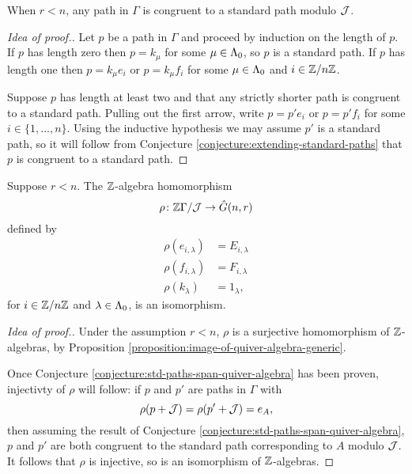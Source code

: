 \documentclass[a4paper, 11pt, twoside]{report}
\begin{document}
\begin{conjecture}\label{conjecture:std-paths-span-quiver-algebra}
When $r<n$, any path in $\Gamma$ is congruent to a standard path modulo $\mathcal{J}$.
\end{conjecture}

\begin{proof}[Idea of proof.]
Let $p$ be a path in $\Gamma$ and proceed by induction on the length of $p$. If $p$ has length zero then $p=k_\mu$ for some $\mu\in\Lambda_0{}$, so $p$ is a standard path. If $p$ has length one then $p=k_\mu e_i$ or $p=k_\mu f_i$ for some $\mu\in\Lambda_0{}$ and $i\in\mathbb{Z}/{n \mathbb{Z}}$.

Suppose $p$ has length at least two and that any strictly shorter path is congruent to a standard path. Pulling out the first arrow, write $p=p'e_i$ or $p=p'f_i$ for some $i\in\{1,\ldots,n\}$. Using the inductive hypothesis we may assume $p'$ is a standard path, so it will follow from Conjecture \ref{conjecture:extending-standard-paths} that $p$ is congruent to a standard path.
\end{proof}

\begin{conjecture}\label{conjecture:presentation-generic-algebra}
Suppose $r<n$. The $\mathbb{Z}$-algebra homomorphism
\begin{equation*}
\rho\colon\mathbb{Z}\Gamma/{\mathcal{J}}\to\hat{G}(n,r)
\end{equation*}
defined by
\begin{align*}
\rho(e_{i,\lambda}) &= E_{i,\lambda}\\
\rho(f_{i,\lambda}) &= F_{i,\lambda}\\
\rho(k_\lambda) &= 1_\lambda,
\end{align*}
for $i\in\mathbb{Z}/{n \mathbb{Z}}$ and $\lambda\in\Lambda_0{}$, is an isomorphism.
\end{conjecture}

\begin{proof}[Idea of proof.]
Under the assumption $r<n$, $\rho$ is a surjective homomorphism of $\mathbb{Z}$-algebras, by Proposition \ref{proposition:image-of-quiver-algebra-generic}.

Once Conjecture \ref{conjecture:std-paths-span-quiver-algebra} has been proven, injectivty of $\rho$ will follow: if $p$ and $p'$ are paths in $\Gamma$ with
\begin{equation*}
\rho(p+\mathcal{J}) = \rho(p'+\mathcal{J}) = e_A,
\end{equation*}
then assuming the result of Conjecture \ref{conjecture:std-paths-span-quiver-algebra}, $p$ and $p'$ are both congruent to the standard path corresponding to $A$ modulo $\mathcal{J}$. It follows that $\rho$ is injective, so is an isomorphism of $\mathbb{Z}$-algebras.
\end{proof}
\end{document}
